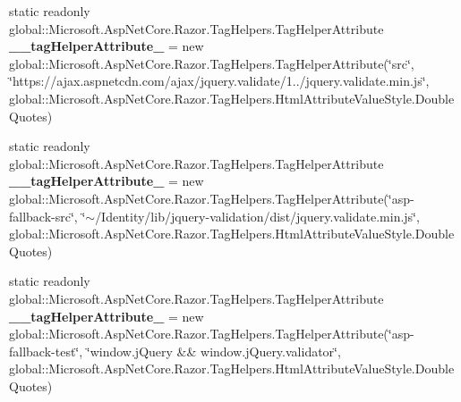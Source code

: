 \begin{DoxyCompactItemize}
\item 
\mbox{\label{class_projeto_e_s_w_1_1_areas_1_1_identity_1_1_pages_1_1_areas___identity___pages_____validation_scripts_partial_a4983a29cd3fc758a21adf6fdc13aa4bd}} 
static readonly global\+::\+Microsoft.\+Asp\+Net\+Core.\+Razor.\+Tag\+Helpers.\+Tag\+Helper\+Attribute {\bfseries \+\_\+\+\_\+tag\+Helper\+Attribute\+\_} = new global\+::\+Microsoft.\+Asp\+Net\+Core.\+Razor.\+Tag\+Helpers.\+Tag\+Helper\+Attribute(\char`\"{}src\char`\"{}, \char`\"{}https\+://ajax.\+aspnetcdn.\+com/ajax/jquery.\+validate/1../jquery.\+validate.\+min.\+js\char`\"{}, global\+::\+Microsoft.\+Asp\+Net\+Core.\+Razor.\+Tag\+Helpers.\+Html\+Attribute\+Value\+Style.\+Double\+Quotes)
\item 
\mbox{\label{class_projeto_e_s_w_1_1_areas_1_1_identity_1_1_pages_1_1_areas___identity___pages_____validation_scripts_partial_a296e1fd27f9cc8f5c6c94b5463c21659}} 
static readonly global\+::\+Microsoft.\+Asp\+Net\+Core.\+Razor.\+Tag\+Helpers.\+Tag\+Helper\+Attribute {\bfseries \+\_\+\+\_\+tag\+Helper\+Attribute\+\_} = new global\+::\+Microsoft.\+Asp\+Net\+Core.\+Razor.\+Tag\+Helpers.\+Tag\+Helper\+Attribute(\char`\"{}asp-\/fallback-\/src\char`\"{}, \char`\"{}$\sim$/Identity/lib/jquery-\/validation/dist/jquery.\+validate.\+min.\+js\char`\"{}, global\+::\+Microsoft.\+Asp\+Net\+Core.\+Razor.\+Tag\+Helpers.\+Html\+Attribute\+Value\+Style.\+Double\+Quotes)
\item 
\mbox{\label{class_projeto_e_s_w_1_1_areas_1_1_identity_1_1_pages_1_1_areas___identity___pages_____validation_scripts_partial_acaace58206c04adf009f6fb283161310}} 
static readonly global\+::\+Microsoft.\+Asp\+Net\+Core.\+Razor.\+Tag\+Helpers.\+Tag\+Helper\+Attribute {\bfseries \+\_\+\+\_\+tag\+Helper\+Attribute\+\_} = new global\+::\+Microsoft.\+Asp\+Net\+Core.\+Razor.\+Tag\+Helpers.\+Tag\+Helper\+Attribute(\char`\"{}asp-\/fallback-\/test\char`\"{}, \char`\"{}window.\+j\+Query \&\& window.\+j\+Query.\+validator\char`\"{}, global\+::\+Microsoft.\+Asp\+Net\+Core.\+Razor.\+Tag\+Helpers.\+Html\+Attribute\+Value\+Style.\+Double\+Quotes)
\item 

\end{DoxyCompactItemize}
